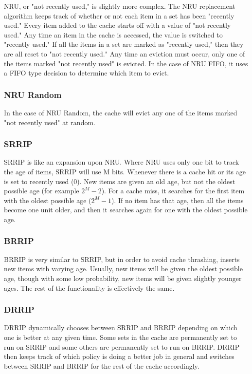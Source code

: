 NRU, or "not recently used," is slightly more complex.  The NRU replacement algorithm keeps track of whether or not each item in a set has been "recently used."  Every item added to the cache starts off with a value of "not recently used."  Any time an item in the cache is accessed, the value is switched to "recently used."  If all the items in a set are marked as "recently used," then they are all reset to "not recently used."  Any time an eviction must occur, only one of the items marked "not recently used" is evicted.  In the case of NRU FIFO, it uses a FIFO type decision to determine which item to evict.

\subsubsection{NRU Random}

In the case of NRU Random, the cache will evict any one of the items marked "not recently used" at random.

\subsubsection{SRRIP}

SRRIP is like an expansion upon NRU.  Where NRU uses only one bit to track the age of items, SRRIP will use M bits.  Whenever there is a cache hit or its age is set to recently used (0).  New items are given an old age, but not the oldest possible age (for example $2^M - 2$).  For a cache miss, it searches for the first item with the oldest possible age ($2^M - 1$).  If no item has that age, then all the items become one unit older, and then it searches again for one with the oldest possible age.

\subsubsection{BRRIP}

BRRIP is very similar to SRRIP, but in order to avoid cache thrashing, inserts new items with varying age.  Usually, new items will be given the oldest possible age, though with some low probability, new items will be given slightly younger ages.  The rest of the functionality is effectively the same.

\subsubsection{DRRIP}

DRRIP dynamically chooses between SRRIP and BRRIP depending on which one is better at any given time.  Some sets in the cache are permanently set to run on SRRIP and some others are permanently set to run on BRRIP.  DRRIP then keeps track of which policy is doing a better job in general and switches between SRRIP and BRRIP for the rest of the cache accordingly.

